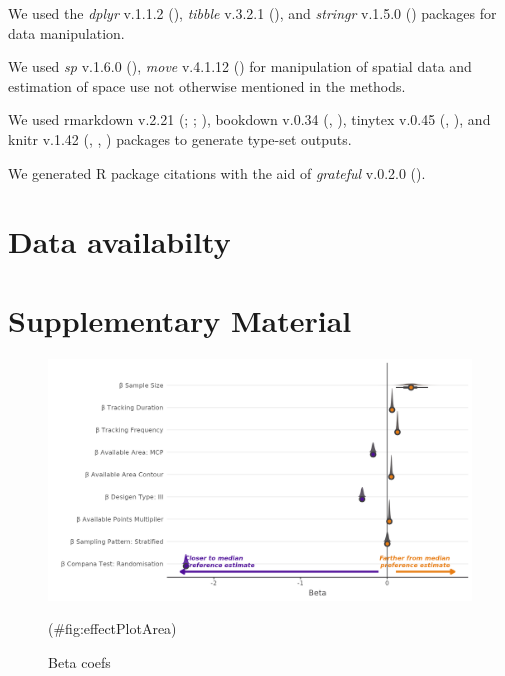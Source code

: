 \documentclass[10pt,a4paper]{article}
\begin{document}
We used the \emph{dplyr} v.1.1.2 (), \emph{tibble} v.3.2.1 (),
and \emph{stringr} v.1.5.0 () packages for data manipulation.

We used \emph{sp} v.1.6.0 (), \emph{move} v.4.1.12 () for manipulation of spatial data and estimation of space use not otherwise mentioned in the methods.

We used rmarkdown v.2.21 (; ; ), bookdown v.0.34 (, ), tinytex v.0.45 (, ), and knitr v.1.42 (, , ) packages to generate type-set outputs.

We generated R package citations with the aid of \emph{grateful} v.0.2.0 ().

\section{Data availabilty}\label{data-availabilty}

\clearpage

\section{Supplementary Material}\label{supplementary-material}

\begin{figure}
\includegraphics[width=1\linewidth]{../figures/areaBrms_effectsPlot} \caption{Beta coefs}(\#fig:effectPlotArea)
\end{figure}
\end{document}
